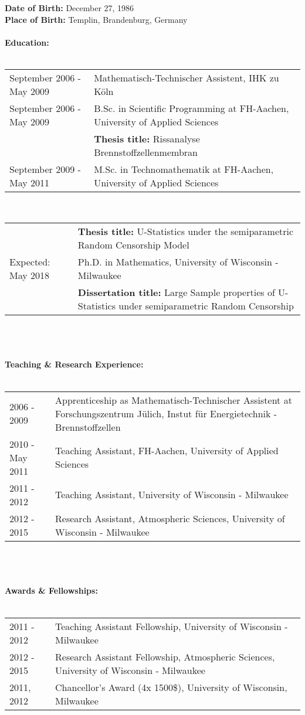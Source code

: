 \documentclass[phd]{UWMThesis}
\renewcommand{\.}{\textrm{ .}}
\theoremstyle{definition}
\numberwithin{thm}{chapter}
\begin{document}
\begin{ThesisCV}
		\noindent\textbf{Date of Birth:} December 27, 1986\\
		\textbf{Place of Birth:} Templin, Brandenburg, Germany\\
		\\
		\textbf{Education:}\\
		\\
		\begin{tabularx}{0.9\textwidth}{l X}
			September 2006 - May 2009 & Mathematisch-Technischer Assistent, IHK zu K\"oln\\
			September 2006 - May 2009 & B.Sc. in Scientific Programming at FH-Aachen, University of Applied Sciences\\
			& \textbf{Thesis title:} Rissanalyse Brennstoffzellenmembran\\
			September 2009 - May 2011 & M.Sc. in Technomathematik at FH-Aachen, University of Applied Sciences\\
		\end{tabularx}
		\\
		\begin{tabularx}{0.9\textwidth}{l X}
			\hphantom{September 2006 - May 2009} & \textbf{Thesis title:} U-Statistics under the semiparametric Random Censorship Model\\
			Expected: May 2018 & Ph.D. in Mathematics, University of Wisconsin - Milwaukee\\
			&\textbf{Dissertation title:} Large Sample properties of U-Statistics under semiparametric Random Censorship
		\end{tabularx}
		\\\\\\
		\noindent\textbf{Teaching \& Research Experience:}\\
		\\
		\begin{tabularx}{0.9\textwidth}{l X}
			2006 - 2009 & Apprenticeship as Mathematisch-Technischer Assistent at Forschungszentrum J\"ulich, Instut f\"ur Energietechnik - Brennstoffzellen\\
			2010 - May 2011 & Teaching Assistant, FH-Aachen, University of Applied Sciences\\
			2011 - 2012 & Teaching Assistant, University of Wisconsin - Milwaukee\\
			2012 - 2015 & Research Assistant, Atmospheric Sciences, University of Wisconsin - Milwaukee
		\end{tabularx}
		\\\\\\
		\clearpage
		\noindent\textbf{Awards \& Fellowships:}\\
		\\
		\begin{tabularx}{0.9\textwidth}{l X}
			2011 - 2012 & Teaching Assistant Fellowship, University of Wisconsin - Milwaukee\\
			2012 - 2015 & Research Assistant Fellowship, Atmospheric Sciences, University of Wisconsin - Milwaukee\\
			2011, 2012 & Chancellor's Award (4x 1500\$), University of Wisconsin, Milwaukee
		\end{tabularx}
		
	\end{ThesisCV}
	
\end{document}
